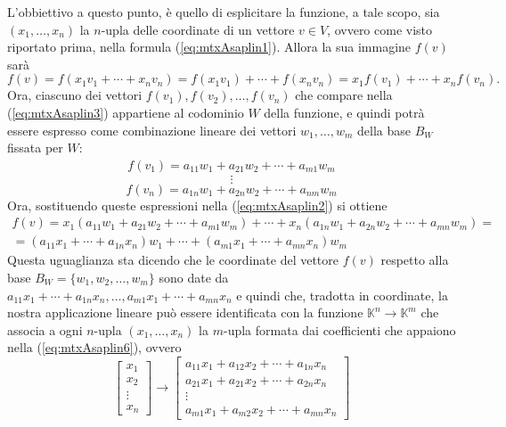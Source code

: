 L'obbiettivo a questo punto, è quello di esplicitare la funzione, a tale
scopo, sia $(x_1,\dots,x_n)$ la $n$-upla delle coordinate di un vettore
$v\in V$, ovvero come visto riportato prima, nella formula
(\ref{eq:mtxAsaplin1}). Allora la sua immagine $f(v)$ sarà
\begin{equation}
  \label{eq:mtxAsaplin3}
  f(v)=f(x_1v_1+\cdots+x_nv_n)=f(x_1v_1)+\cdots+f(x_nv_n)=x_1f(v_1)+\cdots+
  x_nf(v_n).
\end{equation}
Ora, ciascuno dei vettori $f(v_1),f(v_2),\dots,f(v_n)$ che compare nella
(\ref{eq:mtxAsaplin3}) appartiene al codominio $W$ della funzione, e
quindi potrà essere espresso come combinazione lineare dei vettori
$w_1,\dots,w_m$ della base $B_W$ fissata per $W$:
\begin{eqnarray}
  \label{eq:mtxAsaplin4}
  f(v_1)=a_{11}w_1+a_{21}w_2+\cdots+a_{m1}w_{m}
\end{eqnarray}
\begin{equation*}
  \vdots
\end{equation*}
\begin{equation}
  \label{eq:mtxAsaplin5}
  f(v_n)=a_{1n}w_1+a_{2n}w_2+\cdots+a_{nm}w_m
\end{equation}
Ora, sostituendo queste espressioni nella (\ref{eq:mtxAsaplin2}) si
ottiene
\begin{equation}
  \label{eq:mtxAsaplin6}
  \begin{matrix}
    f(v)=x_1(a_{11}w_1+a_{21}w_2+\cdots+a_{m1}w_m)+\cdots+x_n(a_{1n}w_1
    +a_{2n}w_2+\cdots+a_{mn}w_m)=\\
    =(a_{11}x_1+\cdots+a_{1n}x_n)w_1+\cdots+(a_{m1}x_1+\cdots+a_{mn}x_n)w_m
  \end{matrix}
\end{equation}
Questa uguaglianza sta dicendo che le coordinate del vettore $f(v)$
respetto alla base $B_W=\{w_1,w_2,\dots,w_m\}$ sono date da
$a_{11}x_1+\cdots+a_{1n}x_n,\dots,a_{m1}x_1+\cdots+a_{mn}x_n$ e quindi che,
tradotta in coordinate, la nostra applicazione lineare può essere
identificata con la funzione $\mathds{K}^n\to\mathds{K}^m$ che associa a
ogni $n$-upla $(x_1,\dots,x_n)$ la $m$-upla formata dai coefficienti che
appaiono nella (\ref{eq:mtxAsaplin6}), ovvero
\begin{equation}
  \label{eq:mtxAsaplin7}
  \begin{bmatrix}
    x_1\\
    x_2\\
    \vdots\\
    x_n
  \end{bmatrix}\to
  \begin{bmatrix}
    a_{11}x_1+a_{12}x_2+\cdots+a_{1n}x_n\\
    a_{21}x_1+a_{21}x_2+\cdots+a_{2n}x_n\\
    \vdots\\
    a_{m1}x_1+a_{m2}x_2+\cdots+a_{mn}x_n
  \end{bmatrix}
\end{equation}
